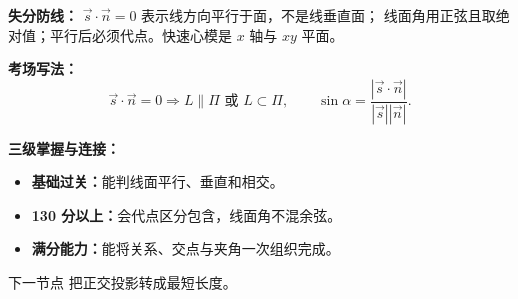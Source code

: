 \begin{knowledgeBox}
\textbf{失分防线：}
\(\vec s\cdot\vec n=0\) 表示线方向平行于面，不是线垂直面；
线面角用正弦且取绝对值；平行后必须代点。快速心模是 \(x\) 轴与 \(xy\) 平面。

\textbf{考场写法：}
\[
\boxed{\vec s\cdot\vec n=0\Rightarrow L\parallel\Pi\text{ 或 }L\subset\Pi,
\qquad
\sin\alpha=\frac{|\vec s\cdot\vec n|}{|\vec s||\vec n|}.}
\]

\textbf{三级掌握与连接：}
\begin{itemize}
  \item \textbf{基础过关：}能判线面平行、垂直和相交。
  \item \textbf{130 分以上：}会代点区分包含，线面角不混余弦。
  \item \textbf{满分能力：}能将关系、交点与夹角一次组织完成。
\end{itemize}
下一节点 
把正交投影转成最短长度。
\end{knowledgeBox}



